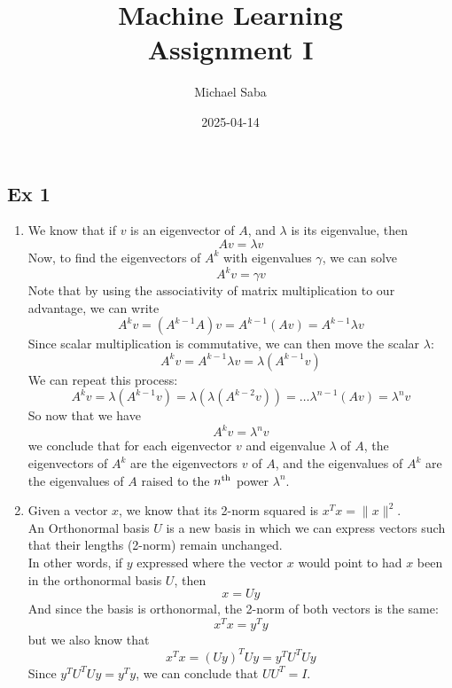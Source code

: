 \documentclass[12pt]{article}
\title{%
    \Huge Machine Learning \\
    \Large Assignment I
}
\date{2025-04-14}
\author{Michael Saba}
\begin{document}
\maketitle
\newpage
\setlength{\parindent}{0pt}

    \subsection*{Ex 1}

    \begin{enumerate}[label=\alph*)]
        \item 
        We know that if $v$ is an eigenvector of $A$,
        and $\lambda$ is its eigenvalue,
        then
        \[ Av = \lambda v \]
        Now, to find the eigenvectors of $A^k$
        with eigenvalues $\gamma$,
        we can solve
        \[ A^k v = \gamma v \]
        Note that by using the associativity
        of matrix multiplication to our advantage,
        we can write
        \[ A^kv = (A^{k-1}A)v = A^{k-1}(Av) 
        = A^{k-1}\lambda v \]
        Since scalar multiplication
        is commutative, we can then
        move the scalar $\lambda$:
        \[  A^kv = A^{k-1}\lambda v
        = \lambda(A^{k-1} v) \]
        We can repeat this process:
        \[ A^kv = \lambda(A^{k-1} v)
        = \lambda(\lambda(A^{k-2} v))
        = \dots \lambda^{n-1}(Av)
        = \lambda^n v  \]
        So now that we have
        \[ A^kv = \lambda^n v \]
        we conclude that for each eigenvector $v$
        and eigenvalue $\lambda$
        of $A$,
        the eigenvectors of $A^k$
        are the eigenvectors $v$ of $A$,
        and the eigenvalues of $A^k$
        are the eigenvalues of $A$ 
        raised to the $n^{\text{th}}$ power $\lambda^n$.
        \item
        Given a vector $x$,
        we know that its 2-norm squared is
        $x^Tx = \|x\|^2$. \\
        An Orthonormal basis $U$ is a new basis
        in which we can express vectors such that
        their lengths (2-norm) remain unchanged. \\
        In other words,
        if $y$ expressed where the vector $x$ 
        would point to had $x$ been in the
        orthonormal basis $U$, then 
        \[ x = Uy \]
        And since the basis is orthonormal,
        the 2-norm of both vectors is the same:
        \[ x^Tx = y^Ty \]
        but we also know that
        \[ x^Tx = (Uy)^TUy = y^TU^TUy \]
        Since $y^TU^TUy = y^Ty$,
        we can conclude that $UU^T = I$. \\

\end{enumerate}
\end{document}
